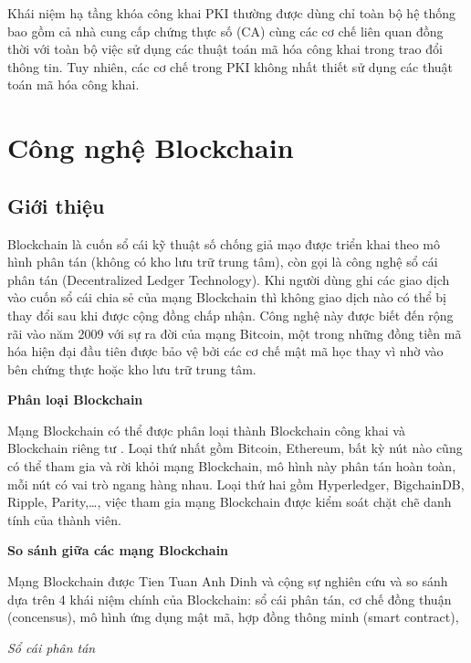 Khái niệm hạ tầng khóa công khai PKI thường được dùng chỉ toàn bộ hệ thống bao gồm cả nhà cung cấp chứng thực số (CA) cùng các cơ chế liên quan đồng thời với toàn bộ việc sử dụng các thuật toán mã hóa công khai trong trao đổi thông tin. Tuy nhiên, các cơ chế trong PKI không nhất thiết sử dụng các thuật toán mã hóa công khai.

\section{Công nghệ Blockchain}
\subsection{Giới thiệu}
Blockchain là cuốn sổ cái kỹ thuật số chống giả mạo được triển khai theo mô hình phân tán (không có kho lưu trữ trung tâm), còn gọi là công nghệ sổ cái phân tán (Decentralized Ledger Technology).
Khi người dùng ghi các giao dịch vào cuốn sổ cái chia sẻ của mạng Blockchain thì không giao dịch nào có thể bị thay đổi sau khi được cộng đồng chấp nhận. 
Công nghệ này được biết đến rộng rãi vào năm 2009 với sự ra đời của mạng Bitcoin\cite{nakamoto2008bitcoin}, một trong những đồng tiền mã hóa hiện đại đầu tiên được bảo vệ bởi các cơ chế mật mã học thay vì nhờ vào bên chứng thực hoặc kho lưu trữ trung tâm.

\textbf{Phân loại Blockchain}

Mạng Blockchain có thể được phân loại thành Blockchain công khai và Blockchain riêng tư \cite{8246573}. 
Loại thứ nhất gồm Bitcoin, Ethereum, bất kỳ nút nào cũng có thể tham gia và rời khỏi mạng Blockchain, mô hình này phân tán hoàn toàn, mỗi nút có vai trò ngang hàng nhau.
Loại thứ hai gồm Hyperledger, BigchainDB, Ripple, Parity,\ldots, việc tham gia mạng Blockchain được kiểm soát chặt chẽ danh tính của thành viên.

\textbf{So sánh giữa các mạng Blockchain}

Mạng Blockchain được Tien Tuan Anh Dinh và cộng sự  \cite{8246573} nghiên cứu và so sánh dựa trên 4 khái niệm chính của Blockchain: sổ cái phân tán, cơ chế đồng thuận (concensus), mô hình ứng dụng mật mã, hợp đồng thông minh (smart contract),

\emph{Sổ cái phân tán}

